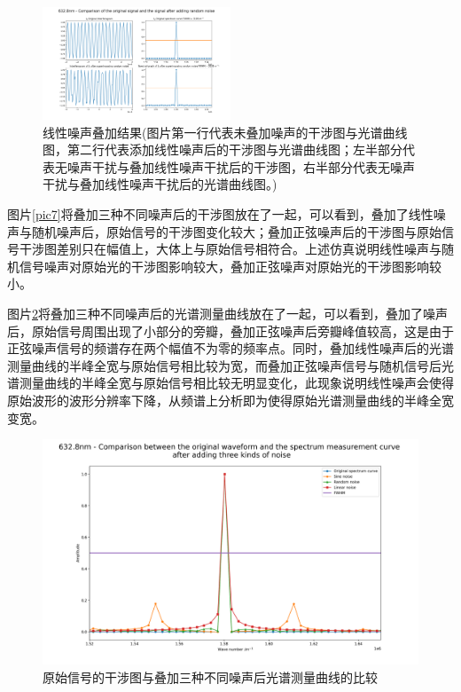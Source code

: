 \documentclass[conference]{IEEEtran}
\begin{document}
\begin{figure}[htbp]
    \centerline{\includegraphics[width=0.5\textwidth]{pic6.png}}
    \caption{线性噪声叠加结果(图片第一行代表未叠加噪声的干涉图与光谱曲线图，第二行代表添加线性噪声后的干涉图与光谱曲线图；左半部分代表无噪声干扰与叠加线性噪声干扰后的干涉图，右半部分代表无噪声干扰与叠加线性噪声干扰后的光谱曲线图。)}
    \label{pic6}
\end{figure}


图片\ref{pic7}将叠加三种不同噪声后的干涉图放在了一起，可以看到，叠加了线性噪声与随机噪声后，原始信号的干涉图变化较大；叠加正弦噪声后的干涉图与原始信号干涉图差别只在幅值上，大体上与原始信号相符合。上述仿真说明线性噪声与随机信号噪声对原始光的干涉图影响较大，叠加正弦噪声对原始光的干涉图影响较小。


图片\ref{pic13}将叠加三种不同噪声后的光谱测量曲线放在了一起，可以看到，叠加了噪声后，原始信号周围出现了小部分的旁瓣，叠加正弦噪声后旁瓣峰值较高，这是由于正弦噪声信号的频谱存在两个幅值不为零的频率点。同时，叠加线性噪声后的光谱测量曲线的半峰全宽与原始信号相比较为宽，而叠加正弦噪声信号与随机信号后光谱测量曲线的半峰全宽与原始信号相比较无明显变化，此现象说明线性噪声会使得原始波形的波形分辨率下降，从频谱上分析即为使得原始光谱测量曲线的半峰全宽变宽。
\begin{figure}[htbp]
	\centerline{
		\includegraphics[width=22cm]{pic13.png} 	
	}
	\caption{原始信号的干涉图与叠加三种不同噪声后光谱测量曲线的比较}
	\label{pic13}
\end{figure}
\end{document}
